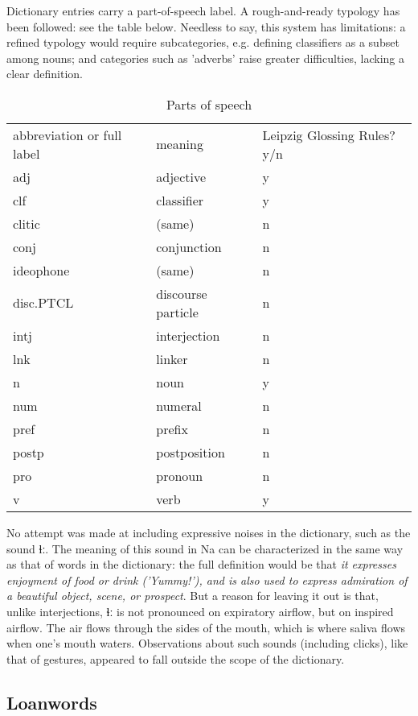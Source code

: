 \documentclass[oldfontcommands,oneside,a4paper,11pt]{article}
\newcommand{\ipa}[1]{{\phon #1}} %
\begin{document}
	Dictionary entries carry a part-of-speech label. A rough-and-ready typology has been followed: see the table below. Needless to say, this system has limitations: a refined typology would require subcategories, e.g. defining classifiers as a subset among nouns; and categories such as 'adverbs' raise greater difficulties, lacking a clear definition.
	\begin{table}
		\caption{Parts of speech}
		\begin{tabular}{lll}
			abbreviation or full label & meaning & Leipzig Glossing Rules? y/n \\
			adj & adjective & y \\
			clf & classifier & y \\
			clitic & (same) & n \\
			conj & conjunction & n \\
			ideophone & (same) & n \\
			disc.PTCL & discourse particle & n \\
			intj & interjection & n \\
			lnk & linker & n \\
			n & noun & y \\
			num & numeral & n \\
			pref & prefix & n \\
			postp & postposition & n \\
			pro & pronoun & n \\
			v & verb & y \\
		\end{tabular}
	\end{table}
	
	No attempt was made at including expressive noises in the dictionary, such as the sound \ipa{ɬː}. The meaning of this sound in Na can be characterized in the same way as that of words in the dictionary: the full definition would be that  \textit{it expresses enjoyment of food or drink ('Yummy!'), and is also used to express admiration of a beautiful object, scene, or prospect}. But a reason for leaving it out is that, unlike interjections,  \ipa{ɬː} is not pronounced on expiratory airflow, but on inspired airflow. The air flows through the sides of the mouth, which is where saliva flows when one's mouth waters. Observations about such sounds (including clicks), like that of gestures, appeared to fall outside the scope of the dictionary.
	
	\subsection{Loanwords} \label{sec:loan}
	
\end{document}
